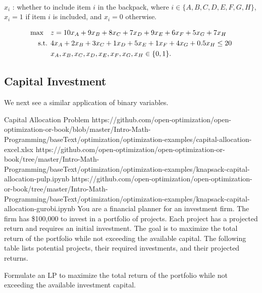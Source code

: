 \begin{solution}
 \\
$x_i$ : whether to include item $i$ in the backpack, where $i \in \{A, B, C, D, E, F, G, H\}$, $x_i = 1$ if item $i$ is included, and $x_i = 0$ otherwise.

\smallskip {}
\begin{align*}
\max \quad & z = 10x_A + 9x_B + 8x_C + 7x_D + 9x_E + 6x_F + 5x_G + 7x_H \\
\mbox{ s.t. }        & 4x_A + 2x_B + 3x_C + 1x_D + 5x_E + 1x_F + 4x_G + 0.5x_H \le 20 \\
& x_A, x_B, x_C, x_D, x_E, x_F, x_G, x_H \in \{0,1\}.
\end{align*}
\end{solution}

\subsection{Capital Investment}
We next see a similar application of binary variables.
\begin{examplewithallcode}{Capital Allocation Problem}
{https://github.com/open-optimization/open-optimization-or-book/blob/master/Intro-Math-Programming/baseText/optimization/optimization-examples/capital-allocation-excel.xlsx}
{https://github.com/open-optimization/open-optimization-or-book/tree/master/Intro-Math-Programming/baseText/optimization/optimization-examples/knapsack-capital-allocation-pulp.ipynb}
{https://github.com/open-optimization/open-optimization-or-book/tree/master/Intro-Math-Programming/baseText/optimization/optimization-examples/knapsack-capital-allocation-gurobi.ipynb}
You are a financial planner for an investment firm. The firm has \$100,000 to invest in a portfolio of projects. Each project has a projected return and requires an initial investment. The goal is to maximize the total return of the portfolio while not exceeding the available capital. The following table lists potential projects, their required investments, and their projected returns.

Formulate an LP to maximize the total return of the portfolio while not exceeding the available investment capital.
\end{examplewithallcode}

